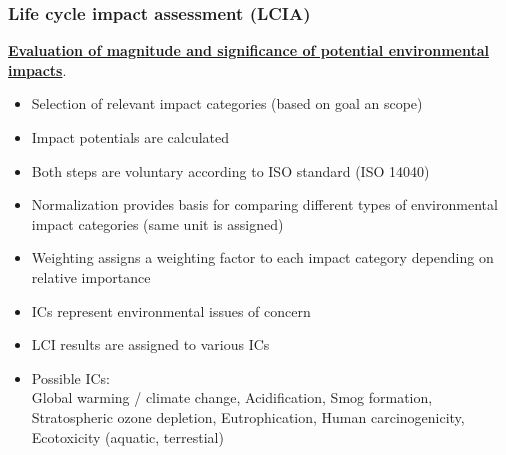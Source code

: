 \documentclass{article}
\begin{document}
\newpage
\subsubsection{Life cycle impact assessment (LCIA)}
\underline{\textbf{Evaluation of magnitude and significance of potential environmental impacts}}.

\vspace*{-.4cm}
\begin{itemize}
    \item Selection of relevant impact categories (based on goal an scope)
    \item Impact potentials are calculated
\end{itemize}

\vspace*{-.4cm}
\begin{itemize}
    \item Both steps are voluntary according to ISO standard (ISO 14040)
    \item Normalization provides basis for comparing different types of environmental impact categories (same unit is assigned)
    \item Weighting assigns a weighting factor to each impact category depending on relative importance
\end{itemize}

\vspace*{-.4cm}
\begin{itemize}
    \item ICs represent environmental issues of concern
    \item LCI results are assigned to various ICs
    \item Possible ICs:\\
    Global warming / climate change, Acidification, Smog formation, Stratospheric ozone depletion, Eutrophication, Human carcinogenicity, Ecotoxicity (aquatic, terrestial)
\end{itemize}
\end{document}
